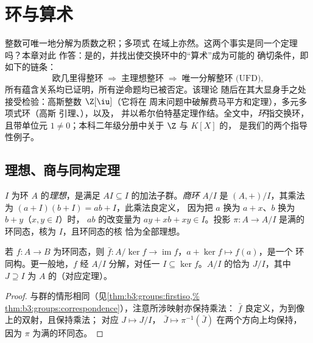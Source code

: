 \chapter{环与算术}\label{ch:b3:rings}

整数可唯一地分解为质数之积；多项式
在域上亦然。这两个事实是同一个定理吗？本章对此
作答：是的，并找出使交换环中的“算术”成为可能的
确切条件，即如下的链条：
\[
\text{欧几里得整环} \;\Longrightarrow\; \text{主理想整环}
\;\Longrightarrow\; \text{唯一分解整环 (UFD)},
\]
所有蕴含关系均已证明，所有逆命题均已被否定。该理论
随后在其大显身手之处接受检验：高斯整数
$\Z[\iu]$（它将在
周末问题中破解费马平方和定理），多元多项式环（高斯
引理、），以及，
并以希尔伯特基定理作结。全文中，\emph{环}指交换环，
且带单位元 $1 \neq 0$；本科二年级分册中关于 $\Z$ 与 $K[X]$ 的，
是我们的两个指导性例子。

\section{理想、商与同构定理}

\begin{definition}\label{def:b3:rings:ideal}
$I$ 为环 $A$ 的\emph{理想}，是满足
$AI \subseteq I$ 的加法子群。\emph{商环} $A/I$ 是
$(A, +)/I$，其乘法为
$(a + I)(b + I) = ab + I$，此乘法良定义，
因为把 $a$ 换为 $a + x$、$b$ 换为 $b + y$（$x, y \in I$）时，
$ab$ 的改变量为 $ay + xb + xy \in I$。投影 $\pi \colon A
\to A/I$ 是满的环同态，核为 $I$，且环同态的核
恰为全部理想。
\end{definition}

\begin{theorem}[第一同构定理]\label{thm:b3:rings:firstiso}
若 $f \colon A \to B$ 为环同态，则 $\bar f\colon
A/\ker f \to \operatorname{im} f$，$a + \ker f \mapsto f(a)$，是一个
环同构。更一般地，$f$ 经 $A/I$ 分解，对任一
 $I \subseteq \ker f$。$A/I$ 的恰为
$J/I$，其中 $J \supseteq I$ 为 $A$ 的（对应定理）。
\end{theorem}

\begin{proof}
与群的情形相同（见\cref{thm:b3:groups:firstiso,%
thm:b3:groups:correspondence}），注意所涉映射亦保持乘法：
$\bar f$ 良定义，为到像上的双射，且保持乘法；
对应 $J \mapsto J/I$，
$\bar J \mapsto \pi^{-1}(\bar J)$ 在两个方向上均保持，
因为 $\pi$ 为满的环同态。
\end{proof}


